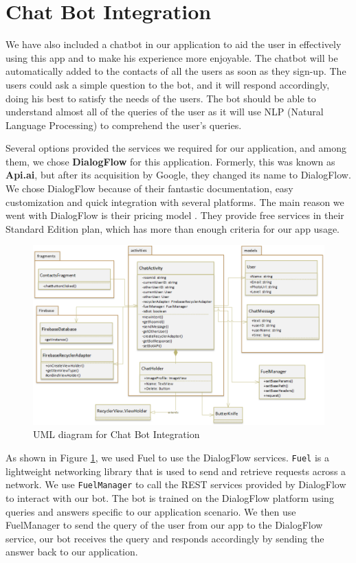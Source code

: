 \section{Chat Bot Integration}
We have also included a chatbot in our application to aid the user in effectively using this app and to make his experience more enjoyable. The chatbot will be automatically added to the contacts of all the users as soon as they sign-up. The users could ask a simple question to the bot, and it will respond accordingly, doing his best to satisfy the needs of the users. The bot should be able to understand almost all of the queries of the user as it will use NLP (Natural Language Processing) to comprehend the user's queries.

Several options provided the services we required for our application, and among them, we chose \textbf{DialogFlow} \cite{DialogFlow2018} for this application. Formerly, this was known as \textbf{Api.ai}, but after its acquisition by Google, they changed its name to DialogFlow. We chose DialogFlow because of their fantastic documentation, easy customization and quick integration with several platforms. The main reason we went with DialogFlow is their pricing model \cite{DialogFlowPricing2018}. They provide free services in their Standard Edition plan, which has more than enough criteria for our app usage. 

\begin{figure}
    \centering
        \includegraphics[width=1.00\textwidth]{images/uml-chat-bot.png}
    \caption{UML diagram for Chat Bot Integration}
    \label{fig:uml-chat-bot}
\end{figure}

As shown in Figure \ref{fig:uml-chat-bot}, we used Fuel to use the DialogFlow services. \texttt{Fuel} is a lightweight networking library that is used to send and retrieve requests across a network. We use \texttt{FuelManager} to call the REST services provided by DialogFlow to interact with our bot. The bot is trained on the DialogFlow platform using queries and answers specific to our application scenario. We then use FuelManager to send the query of the user from our app to the DialogFlow service, our bot receives the query and responds accordingly by sending the answer back to our application. 

